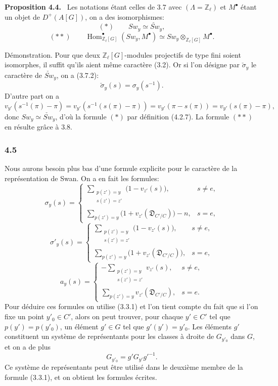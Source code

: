 \documentclass[11pt]{article}
\newenvironment{statement}[1]{\par\medskip\noindent\textbf{#1.}\ }{\par\medskip}
\DeclareMathOperator{\Hom}{Hom}
\providecommand{\Hom}{\operatorname{Hom}}
\begin{document}
\begin{statement}{Proposition 4.4}
Les notations étant celles de 3.7 avec $(\Lambda=\mathbb Z_\ell)$ et $M^\bullet$ étant un objet de $D^+(A[G])$, on a des isomorphismes:
\[
(*)\qquad Sw_y\simeq \check{Sw}_y,
\]
\[
(**)\qquad
\Hom^\bullet_{\mathbb Z_\ell[G]}(Sw_y,M^\bullet)
\simeq Sw_y\otimes_{\mathbb Z_\ell[G]}M^\bullet.
\]
\end{statement}

Démonstration. Pour que deux $\mathbb Z_\ell[G]$-modules projectifs de type fini soient isomorphes, il suffit qu'ils aient même caractère (3.2). Or si l'on désigne par $\check\sigma_y$ le caractère de $\check{Sw}_y$, on a (3.7.2):
\[
\check\sigma_y(s)=\sigma_y(s^{-1}).
\]
D'autre part on a
\[
v_{y'}(s^{-1}(\pi)-\pi)
=v_{y'}(s^{-1}(s(\pi)-\pi))
=v_{y'}(\pi-s(\pi))
=v_{y'}(s(\pi)-\pi),
\]
donc $Sw_y\simeq\check{Sw}_y$, d'où la formule $(*)$ par définition (4.2.7). La formule $(**)$ en résulte grâce à 3.8.

\subsubsection*{4.5}

Nous aurons besoin plus bas d'une formule explicite pour le caractère de la représentation de Swan. On a en fait les formules:
\[
\sigma_y(s)=
\begin{cases}
\displaystyle\sum_{\substack{p(z')=y\\s(z')=z'}}\bigl(1-v_{z'}(s)\bigr),& s\ne e,\\[0.8em]
\displaystyle\sum_{p(z')=y}\bigl(1+v_{z'}(\mathfrak D_{C'/C})\bigr)-n,& s=e,
\end{cases}
\tag{4.5.1}
\]
\[
\sigma'_y(s)=
\begin{cases}
\displaystyle\sum_{\substack{p(z')=y\\s(z')=z'}}\bigl(1-v_{z'}(s)\bigr),& s\ne e,\\[0.8em]
\displaystyle\sum_{p(z')=y}\bigl(1+v_{z'}(\mathfrak D_{C'/C})\bigr),& s=e,
\end{cases}
\tag{4.5.2}
\]
\[
a_y(s)=
\begin{cases}
\displaystyle-\sum_{\substack{p(z')=y\\s(z')=z'}}v_{z'}(s),& s\ne e,\\[0.8em]
\displaystyle\sum_{p(z')=y}v_{z'}(\mathfrak D_{C'/C}),& s=e.
\end{cases}
\tag{4.5.3}
\]
Pour déduire ces formules on utilise (3.3.1) et l'on tient compte du fait que si l'on fixe un point $y'_0\in C'$, alors on peut trouver, pour chaque $y'\in C'$ tel que $p(y')=p(y'_0)$, un élément $g'\in G$ tel que $g'(y')=y'_0$. Les éléments $g'$ constituent un système de représentants pour les classes à droite de $G_{y'_0}$ dans $G$, et on a de plus
\[
G_{y'_0}=g'G_{y'}g'^{-1}.
\]
Ce système de représentants peut être utilisé dans le deuxième membre de la formule (3.3.1), et on obtient les formules écrites.
\end{document}
